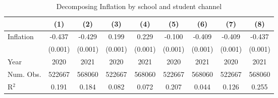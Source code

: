 \begin{table}[htbp]
\centering
\caption{Decomposing Inflation by school and student channel}
\begin{tabular}{lcccccccc}
\toprule
 & (1) & (2) & (3) & (4) & (5) & (6) & (7) & (8) \\
\midrule
Inflation & -0.437 & -0.429 & 0.199 & 0.229 & -0.100 & -0.409 & -0.409 & -0.437 \\
            & (0.001) & (0.001) & (0.001) & (0.001) & (0.001) & (0.001) & (0.001) & (0.001) \\
\midrule
Year & 2020 & 2021 & 2020 & 2021 & 2020 & 2021 & 2020 & 2021 \\
Num. Obs.   & 522667 & 568060 & 522667 & 568060 & 522667 & 568060 & 522667 & 568060 \\
R$^2$       & 0.191  & 0.184  & 0.082  & 0.072  & 0.207  & 0.044  & 0.126  & 0.255  \\
\bottomrule
\end{tabular}
\end{table}
